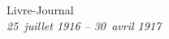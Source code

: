 \LJpageimpaire
{}
\thispagestyle{vide}
\renewcommand{\LJmois}{}\renewcommand{\LJfolio}{}
\vspace*{\fill}
\begin{center}
{\fontsize{24pt}{26pt}\selectfont Livre-Journal}\\[4mm]
{\large\itshape 25~juillet 1916 – 30~avril 1917}
\end{center}
\clearpage
